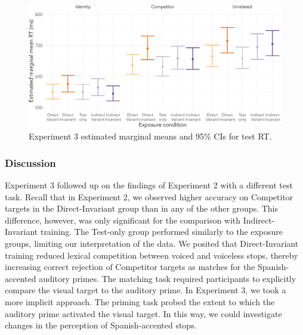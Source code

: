 \documentclass[
  12pt,
  twoside]{article}
\begin{document}
\begin{figure}[H]

{\centering \includegraphics[width=\textwidth]{sections/code/outputs/train_plot_2} 

}

\caption{Experiment 3 estimated marginal means and 95\% CIs for test RT.}\label{fig:exp3-test-fig}
\end{figure}

\hypertarget{discussion-1}{%
\subsubsection{Discussion}\label{discussion-1}}

Experiment 3 followed up on the findings of Experiment 2 with a different test task.
Recall that in Experiment 2, we observed higher accuracy on Competitor targets in the Direct-Invariant group than in any of the other groups.
This difference, however, was only significant for the comparison with Indirect-Invariant training.
The Test-only group performed similarly to the exposure groups, limiting our interpretation of the data.
We posited that Direct-Invariant training reduced lexical competition between voiced and voiceless stops, thereby increasing correct rejection of Competitor targets as matches for the Spanish-accented auditory primes.
The matching task required participants to explicitly compare the visual target to the auditory prime.
In Experiment 3, we took a more implicit approach.
The priming task probed the extent to which the auditory prime activated the visual target.
In this way, we could investigate changes in the perception of Spanish-accented stops.
\end{document}
